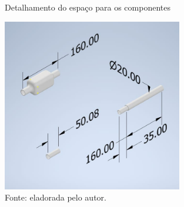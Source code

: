         \begin{figure}[h!]
        \captionsetup{width=1\textwidth}
        \caption{\label{fig:prototipo3}Detalhamento do espaço para os componentes}
        \centering
        \includegraphics[width=0.7\textwidth]{figuras/prototipo3.jpeg} 
        \caption*{Fonte: eladorada pelo autor.}
    \end{figure}
